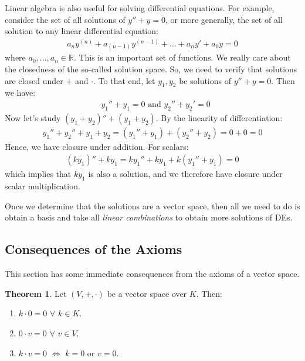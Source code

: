 \documentclass[11pt]{scrartcl}
\newcommand{\R}[0]{\mathbb{R}}
\theoremstyle{definition}
\newtheorem{theorem}{Theorem}
\theoremstyle{remark}
\begin{document}
Linear algebra is also useful for solving differential equations. For example, consider the set of all solutions of $y'' + y = 0$, or more generally, the set of all solution to any linear differential equation: 
\begin{align*}
	a_n y^{(n)} + a_{(n-1)}y^{(n-1)} + ... + a_ny' + a_0 y = 0 	
\end{align*}
where $a_0, ..., a_n \in \R$. This is an important set of functions. We really care about the closedness of the so-called solution space. So, we need to verify that solutions are closed under $+$ and $\cdot$. To that end, let $y_1, y_2$ be solutions of $y'' + y = 0$. Then we have: 
\begin{align*}
	& y_1'' + y_1 = 0 \text{ and } y_2'' + y_2 ' = 0 	
\end{align*}
Now let's study $(y_1 + y_2)'' + (y_1 + y_2)$. By the linearity of differentiation: 
\begin{align*}
	y_1 '' + y_2 '' + y_1 + y_2 = (y_1'' + y_1) + (y_2'' + y_2) = 0 + 0 = 0 	
\end{align*}
Hence, we have closure under addition. For scalars: 
\begin{align*}
	(ky_1)'' + ky_1 = ky_1'' +ky_1 + k(y_1'' + y_1) = 0 	
\end{align*}
which implies that $ky_1$ is also a solution, and we therefore have closure under scalar multiplication. 

Once we determine that the solutions are a vector space, then all we need to do is obtain a basis and take all \emph{linear combinations} to obtain more solutions of DEs. 

\subsection{Consequences of the Axioms}
This section has some immediate consequences from the axioms of a vector space. 

\begin{theorem}
	Let $(V, +, \cdot)$ be a vector space over $K$. Then: 
	\begin{enumerate}[noitemsep]
		\item $k \cdot 0 = 0$ $\forall$ $k \in K$. 
		\item $0 \cdot v = 0$ $\forall$ $v \in V$. 
		\item $k \cdot v = 0$ $\iff$ $k =0 $ or $v=0$. 
	\end{enumerate}
\end{theorem}
\end{document}
